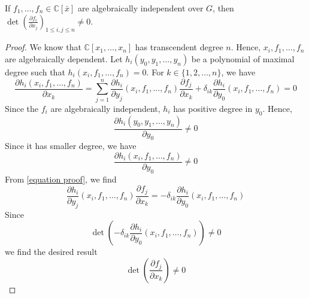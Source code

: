 \documentclass[envcountsame,envcountchap]{svmono}
\begin{document}
\begin{lemma}
If $f_1, \ldots, f_n \in \mathbb{C}[\bar{x}]$ are algebraically independent over $G$, then $\det \left( \frac{\partial f_i}{\partial x_j} \right)_{1 \le i,j \le n} \neq 0$. 
\label{useful lemma}
\end{lemma}
\begin{proof}
We know that $\mathbb{C}[x_1, \ldots , x_n]$ has transcendent degree $n$. Hence, $x_i, f_1, \ldots, f_n$ are algebraically dependent. Let $h_i (y_0, y_1, \ldots, y_n)$ be a polynomial of maximal degree such that $h_i (x_i, f_1, \ldots , f_n ) = 0$. For $k \in \{1, 2, \ldots, n \}$, we have
\begin{equation}
\frac{\partial h_i (x_i, f_1, \ldots, f_n)}{\partial x_k} = \sum_{j=1}^n \frac{\partial h_i }{\partial y_j}(x_i, f_1, \ldots, f_n) \frac{\partial f_j}{\partial x_k} + \delta_{ik} \frac{\partial h_i}{\partial y_0} (x_i, f_1, \ldots, f_n) = 0
\label{equation proof}
\end{equation} Since the $f_i$ are algebraically independent, $h_i$ has positive degree in $y_0$. Hence, 
\begin{equation}
\frac{\partial h_i (y_0, y_1, \ldots, y_n)}{\partial y_0}  \neq 0
\end{equation} Since it has smaller degree, we have
\begin{equation}
\frac{\partial h_i (x_i, f_1, \ldots, f_n)}{\partial y_0}  \neq 0
\end{equation} From \eqref{equation proof}, we find
\begin{equation}
\frac{\partial h_i }{\partial y_j}(x_i, f_1, \ldots, f_n) \frac{\partial f_j}{\partial x_k} = - \delta_{ik} \frac{\partial h_i}{\partial y_0} (x_i, f_1, \ldots, f_n) 
\end{equation} Since
\begin{equation}
\det \left( - \delta_{ik} \frac{\partial h_i}{\partial y_0} (x_i, f_1, \ldots, f_n)  \right) \neq 0
\end{equation} we find the desired result
\begin{equation}
\det \left( \frac{\partial f_j}{\partial x_k} \right) \neq 0
\end{equation}
\end{proof}
\end{document}
